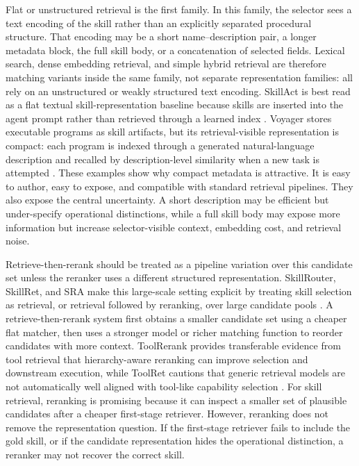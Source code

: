 Flat or unstructured retrieval is the first family. In this family, the selector sees a text encoding of the skill rather than an explicitly separated procedural structure. That encoding may be a short name--description pair, a longer metadata block, the full skill body, or a concatenation of selected fields. Lexical search, dense embedding retrieval, and simple hybrid retrieval are therefore matching variants inside the same family, not separate representation families: all rely on an unstructured or weakly structured text encoding. SkillAct is best read as a flat textual skill-representation baseline because skills are inserted into the agent prompt rather than retrieved through a learned index \cite{liu2024skillact}. Voyager stores executable programs as skill artifacts, but its retrieval-visible representation is compact: each program is indexed through a generated natural-language description and recalled by description-level similarity when a new task is attempted \cite{wang2023voyager}. These examples show why compact metadata is attractive. It is easy to author, easy to expose, and compatible with standard retrieval pipelines. They also expose the central uncertainty. A short description may be efficient but under-specify operational distinctions, while a full skill body may expose more information but increase selector-visible context, embedding cost, and retrieval noise.

Retrieve-then-rerank should be treated as a pipeline variation over this candidate set unless the reranker uses a different structured representation. SkillRouter, SkillRet, and SRA make this large-scale setting explicit by treating skill selection as retrieval, or retrieval followed by reranking, over large candidate pools \cite{zheng2026skillrouter,cho2026skillret,su2026sra}. A retrieve-then-rerank system first obtains a smaller candidate set using a cheaper flat matcher, then uses a stronger model or richer matching function to reorder candidates with more context. ToolRerank provides transferable evidence from tool retrieval that hierarchy-aware reranking can improve selection and downstream execution, while ToolRet cautions that generic retrieval models are not automatically well aligned with tool-like capability selection \cite{zheng2024toolrerank,shi2025toolret}. For skill retrieval, reranking is promising because it can inspect a smaller set of plausible candidates after a cheaper first-stage retriever. However, reranking does not remove the representation question. If the first-stage retriever fails to include the gold skill, or if the candidate representation hides the operational distinction, a reranker may not recover the correct skill.

